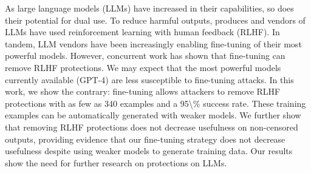 As large language models (LLMs) have increased in their capabilities, so does their potential for dual use. To reduce harmful outputs, produces and vendors of LLMs have used reinforcement learning with human feedback (RLHF). In tandem, LLM vendors have been increasingly enabling fine-tuning of their most powerful models. However, concurrent work has shown that fine-tuning can remove RLHF protections. We may expect that the most powerful models currently available (GPT-4) are less susceptible to fine-tuning attacks.  In this work, we show the contrary: fine-tuning allows attackers to remove RLHF protections with as few as 340 examples and a 95\textbackslash{}\% success rate. These training examples can be automatically generated with weaker models. We further show that removing RLHF protections does not decrease usefulness on non-censored outputs, providing evidence that our fine-tuning strategy does not decrease usefulness despite using weaker models to generate training data. Our results show the need for further research on protections on LLMs.